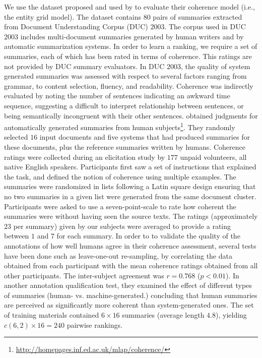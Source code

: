 We use the dataset proposed and used by  to evaluate their  coherence model (i.e., the entity grid model).  
The dataset contains $80$ pairs of summaries extracted from Document Understanding Corpus (DUC) $2003$. 
The corpus used in DUC 2003 includes multi-document summaries generated by human writers and by automatic summarization systems. 
In order to learn a ranking, we require a set of summaries, each of which has been rated in terms of coherence. 
This ratings are not provided by DUC summary evaluators. 
In DUC $2003$, the quality of system generated summaries was assessed with respect to several factors ranging from grammar, to content selection, fluency, and readability. 
Coherence was indirectly evaluated by noting the number of sentences indicating an awkward time sequence, suggesting a difficult to interpret relationship between sentences, or being semantically incongruent with their other sentences. 
 obtained judgments for automatically generated summaries from human subjects\footnote{\url{http://homepages.inf.ed.ac.uk/mlap/coherence/}}.
They randomly selected $16$ input documents and five systems that had produced summaries for these documents, plus the reference summaries written by humans. 
Coherence ratings were collected during an elicitation study by $177$ unpaid volunteers, all native English speakers. 
Participants first saw a set of instructions that explained the task, and defined the notion of coherence using multiple examples. 
The summaries were randomized in lists following a Latin square design ensuring that no two summaries in a given list were generated from the same document cluster. 
Participants were asked to use a seven-point-scale to rate how coherent the summaries were without having seen the source texts. 
The ratings (approximately $23$ per summary) given by our subjects were averaged to provide a rating between $1$ and $7$ for each summary. 
In order to to validate the quality of the annotations of how well humans agree in their coherence assessment, several tests have been done such as leave-one-out re-sampling, by correlating the data obtained from each participant with the mean coherence ratings obtained from all other participants. 
The inter-subject agreement was $r = 0.768$ ($p < 0.01$). 
In another annotation qualification test, they examined the effect of different types of summaries (human- vs. machine-generated.) concluding that human summaries are perceived as significantly more coherent than system-generated ones. 
The set of training materials contained $6 × 16$ summaries (average length $4.8$), yielding $c(6,2) × 16 = 240$ pairwise rankings. 
